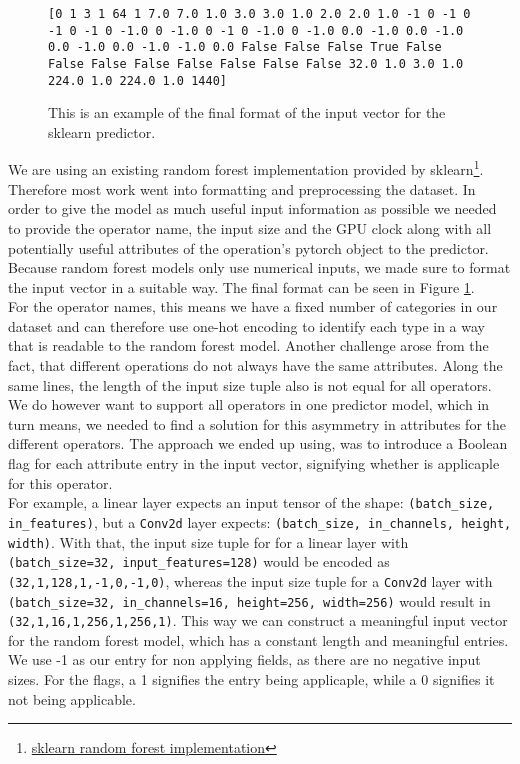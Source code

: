 \begin{figure}
\texttt{[0 1 3 1 64 1 7.0 7.0 1.0 3.0 3.0 1.0 2.0 2.0 1.0 -1 0 -1 0 -1 0 -1 0 -1.0 0 -1.0 0 -1 0 -1.0 0 -1.0 0.0 -1.0 0.0 -1.0 0.0 -1.0 0.0 -1.0 -1.0 0.0 False False False True False False False False False False False False 32.0 1.0 3.0 1.0 224.0 1.0 224.0 1.0 1440]}
\caption{This is an example of the final format of the input vector for the sklearn predictor.}
\label{input_vector}
\end{figure}

We are using an existing random forest implementation provided by sklearn\footnote{\href{https://scikit-learn.org/stable/modules/generated/sklearn.ensemble.RandomForestRegressor.html}{sklearn random forest implementation} }. Therefore most work went into formatting and preprocessing the dataset. In order to give the model as much useful input information as possible we needed to provide the operator name, the input size and the GPU clock along with all potentially useful attributes of the operation's pytorch object to the predictor. \\
Because random forest models only use numerical inputs, we made sure to format the input vector in a suitable way. The final format can be seen in Figure \ref{input_vector}.\\
For the operator names, this means we have a fixed number of categories in our dataset and can therefore use one-hot encoding to identify each type in a way that is readable to the random forest model. Another challenge arose from the fact, that different operations do not always have the same attributes. Along the same lines, the length of the input size tuple also is not equal for all operators. We do however want to support all operators in one predictor model, which in turn means, we needed to find a solution for this asymmetry in attributes for the different operators. The approach we ended up using, was to introduce a Boolean flag for each attribute entry in the input vector, signifying whether is applicaple for this operator.\\
For example, a linear layer expects an input tensor of the shape: \texttt{(batch\_size, in\_features)}, but a \texttt{Conv2d} layer expects: \texttt{(batch\_size, in\_channels, height, width)}. With that, the input size tuple for for a linear layer with \texttt{(batch\_size=32, input\_features=128)} would be encoded as \texttt{(32,1,128,1,-1,0,-1,0)}, whereas the input size tuple for a \texttt{Conv2d} layer with \texttt{(batch\_size=32, in\_channels=16, height=256, width=256)} would result in \texttt{(32,1,16,1,256,1,256,1)}. This way we can construct a meaningful input vector for the random forest model, which has a constant length and meaningful entries. We use -1 as our entry for non applying fields, as there are no negative input sizes. For the flags, a 1 signifies the entry being applicaple, while a 0 signifies it not being applicable.\\

